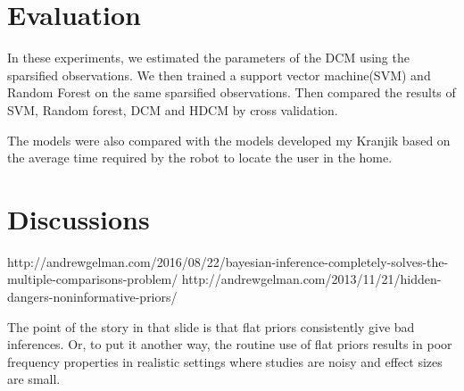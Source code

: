 \documentclass[12pt,parskip=half, DIV=calc, BCOR=10mm, x11names]{scrbook}
\begin{document}
\FloatBarrier

\section{Evaluation}

In these experiments, we estimated the parameters of the DCM using the sparsified observations. We then trained a support vector machine(SVM) and Random Forest on the same sparsified observations. Then compared the results of SVM, Random forest, DCM and HDCM by cross validation.




The models were also compared with the models developed my Kranjik  based on the average time required by the robot to locate the user in the home.





\section{Discussions}

http://andrewgelman.com/2016/08/22/bayesian-inference-completely-solves-the-multiple-comparisons-problem/
http://andrewgelman.com/2013/11/21/hidden-dangers-noninformative-priors/

The point of the story in that slide is that flat priors consistently give bad inferences. Or, to put it another way, the routine use of flat priors results in poor frequency properties in realistic settings where studies are noisy and effect sizes are small.
\label{sec:}

\end{document}
